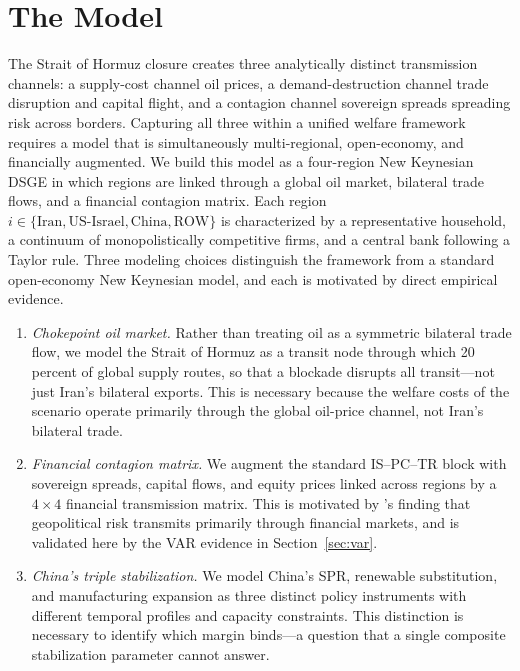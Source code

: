 \documentclass[12pt]{article}
\begin{document}
\section{The Model}
\label{sec:model}

The Strait of Hormuz closure creates three analytically distinct transmission channels: a supply-cost channel oil prices, a demand-destruction channel trade disruption and capital flight, and a contagion channel sovereign spreads spreading risk across borders. Capturing all three within a unified welfare framework requires a model that is simultaneously multi-regional, open-economy, and financially augmented. We build this model as a four-region New Keynesian DSGE in which regions are linked through a global oil market, bilateral trade flows, and a financial contagion matrix. Each region $i \in \{\text{Iran}, \text{US-Israel}, \text{China}, \text{ROW}\}$ is characterized by a representative household, a continuum of monopolistically competitive firms, and a central bank following a Taylor rule. Three modeling choices distinguish the framework from a standard open-economy New Keynesian model, and each is motivated by direct empirical evidence.

\begin{enumerate}[leftmargin=2em, itemsep=2pt, topsep=4pt]
\item \textit{Chokepoint oil market.} Rather than treating oil as a symmetric bilateral trade flow, we model the Strait of Hormuz as a transit node through which 20 percent of global supply routes, so that a blockade disrupts all transit---not just Iran's bilateral exports. This is necessary because the welfare costs of the scenario operate primarily through the global oil-price channel, not Iran's bilateral trade.
\item \textit{Financial contagion matrix.} We augment the standard IS--PC--TR block with sovereign spreads, capital flows, and equity prices linked across regions by a $4 \times 4$ financial transmission matrix. This is motivated by \citet{caldara2022measuring}'s finding that geopolitical risk transmits primarily through financial markets, and is validated here by the VAR evidence in Section~\ref{sec:var}.
\item \textit{China's triple stabilization.} We model China's SPR, renewable substitution, and manufacturing expansion as three distinct policy instruments with different temporal profiles and capacity constraints. This distinction is necessary to identify which margin binds---a question that a single composite stabilization parameter cannot answer.
\end{enumerate}
\end{document}
